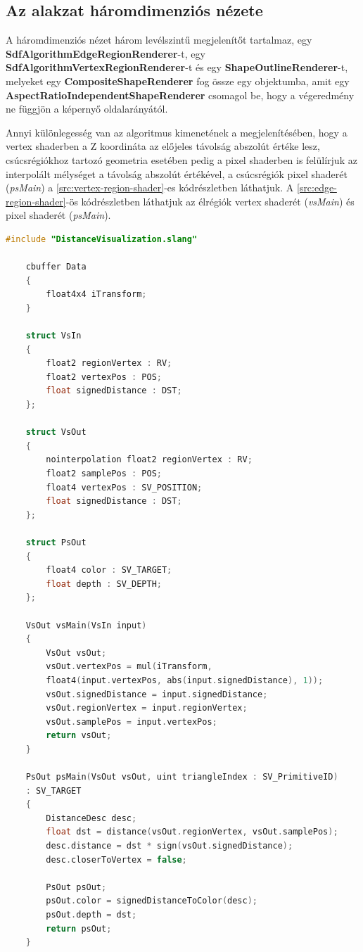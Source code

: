 \subsection{Az alakzat háromdimenziós nézete}

A háromdimenziós nézet három levélszintű megjelenítőt tartalmaz, egy \textbf{SdfAlgorithmEdgeRegionRenderer}-t, egy \textbf{SdfAlgorithmVertexRegionRenderer}-t és egy \textbf{ShapeOutlineRenderer}-t, melyeket egy \textbf{CompositeShapeRenderer} fog össze egy objektumba, amit egy \textbf{AspectRatioIndependentShapeRenderer} csomagol be, hogy a végeredmény ne függjön a képernyő oldalarányától.

Annyi különlegesség van az algoritmus kimenetének a megjelenítésében, hogy a vertex shaderben \cite{vertexshader} a Z koordináta az előjeles távolság abszolút értéke lesz, csúcsrégiókhoz tartozó geometria esetében pedig a pixel shaderben is felülírjuk az interpolált mélységet a távolság abszolút értékével, a csúcsrégiók pixel shaderét \cite{pixelshader} (\textit{psMain}) a \ref{src:vertex-region-shader}-es kódrészletben láthatjuk. A \ref{src:edge-region-shader}-ös kódrészletben láthatjuk az élrégiók vertex shaderét (\textit{vsMain}) és pixel shaderét (\textit{psMain}).

\begin{lstlisting}[language=c]
	#include "DistanceVisualization.slang"

	cbuffer Data
	{
		float4x4 iTransform;
	}

	struct VsIn
	{
		float2 regionVertex : RV;
		float2 vertexPos : POS;
		float signedDistance : DST;
	};

	struct VsOut
	{
		nointerpolation float2 regionVertex : RV;
		float2 samplePos : POS;
		float4 vertexPos : SV_POSITION;
		float signedDistance : DST;
	};

	struct PsOut
	{
		float4 color : SV_TARGET;
		float depth : SV_DEPTH;
	};

	VsOut vsMain(VsIn input)
	{
		VsOut vsOut;
		vsOut.vertexPos = mul(iTransform,
		float4(input.vertexPos, abs(input.signedDistance), 1));
		vsOut.signedDistance = input.signedDistance;
		vsOut.regionVertex = input.regionVertex;
		vsOut.samplePos = input.vertexPos;
		return vsOut;
	}

	PsOut psMain(VsOut vsOut, uint triangleIndex : SV_PrimitiveID)
	: SV_TARGET
	{
		DistanceDesc desc;
		float dst = distance(vsOut.regionVertex, vsOut.samplePos);
		desc.distance = dst * sign(vsOut.signedDistance);
		desc.closerToVertex = false;

		PsOut psOut;
		psOut.color = signedDistanceToColor(desc);
		psOut.depth = dst;
		return psOut;
	}
\end{lstlisting}


